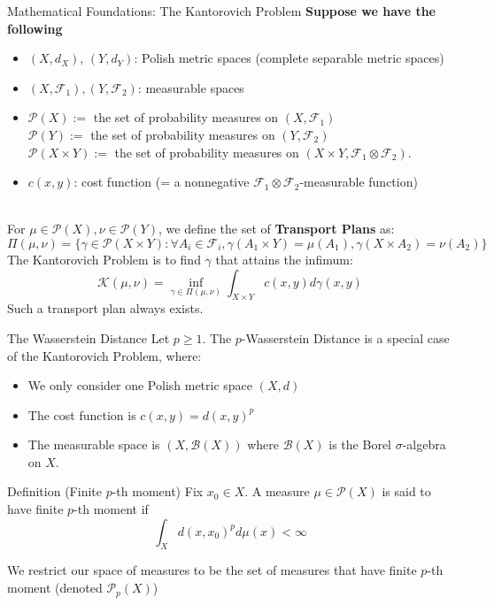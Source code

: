 \documentclass{beamer}
\begin{document}
\begin{frame}{Mathematical Foundations: The Kantorovich Problem}
  \textbf{Suppose we have the following}
  \begin{itemize}
    \item $(X, d_X)$, $(Y, d_Y)$: Polish metric spaces (complete separable metric spaces)
    \item $(X, \mathcal{F}_1), (Y, \mathcal{F}_2)$: measurable spaces
    \item $\mathcal{P}(X) :=$ the set of probability measures on $(X, \mathcal{F}_1)$\\ $\mathcal{P}(Y) :=$ the set of probability measures on $(Y, \mathcal{F}_2)$\\ $\mathcal{P}(X \times Y) :=$ the set of probability measures on $(X \times Y, \mathcal{F}_1 \otimes \mathcal{F}_2)$.
    \item $c(x, y)$: cost function (= a nonnegative $\mathcal{F}_1 \otimes \mathcal{F}_2$-measurable function)
  \end{itemize}
~\\ For $\mu \in \mathcal{P}(X), \nu \in \mathcal{P}(Y)$, we define the set of \textbf{Transport Plans} as:
  \small{\[
  \Pi(\mu,\nu) = \{\gamma \in \mathcal{P}(X \times Y) : \forall A_i \in \mathcal{F}_i, \gamma (A_1 \times Y) = \mu (A_1), \gamma (X \times A_2) = \nu (A_2)\}
  \]}
  \normalsize The Kantorovich Problem is to find $\gamma$ that attains the infimum:
  \[
    \mathcal{K}(\mu, \nu) = \inf_{\gamma \in \Pi(\mu, \nu)} \int_{X \times Y} c(x, y) d\gamma(x, y)
  \]
  Such a transport plan always exists.
\end{frame}

\begin{frame}{The Wasserstein Distance}
  Let $p \ge 1$. The $p$-Wasserstein Distance is a special case of the Kantorovich Problem, where:
  \begin{itemize}
    \item We only consider one Polish metric space $(X,d)$
    \item The cost function is $c(x,y) = d(x,y)^p$
    \item The measurable space is $(X, \mathcal{B}(X))$ where $\mathcal{B}(X)$ is the Borel $\sigma$-algebra on $X$.
  \end{itemize}

  \begin{block}{Definition (Finite $p$-th moment)}
  Fix $x_0 \in X$. A measure $\mu \in \mathcal{P}(X)$ is said to have finite $p$-th moment if \[
\int _X d(x,x_0)^p d\mu (x) < \infty\]
  \end{block}

  We restrict our space of measures to be the set of measures that have finite $p$-th moment (denoted $\mathcal{P}_p(X)$)
\end{frame}
\end{document}
